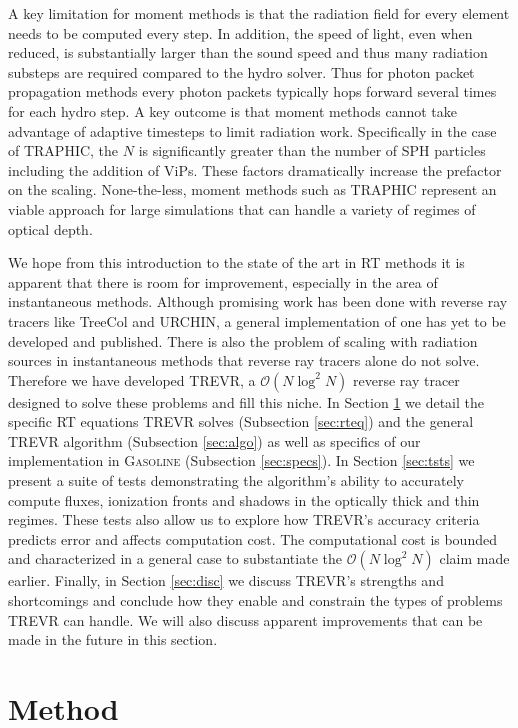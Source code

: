 \documentclass[fleq,usenatbib]{mnras}
\newcommand{\acro}{TREVR}
\newcommand{\bigO}[1]{\mathcal{O}\left(#1\right)}
\begin{document}
A key limitation for moment methods is that the radiation field for every element needs to be 
computed every step.  In addition, the speed of light, even when reduced, is substantially larger than the sound speed and thus many radiation substeps are required compared to the hydro solver.
Thus for photon packet propagation methods every photon packets typically hops
forward several times for each hydro step.
A key outcome is that moment methods cannot take
advantage of adaptive timesteps to limit radiation work.
Specifically in the case of TRAPHIC, the $N$ is significantly greater than 
the number of SPH particles including the addition of ViPs.
These factors dramatically increase the prefactor on the scaling.  None-the-less, moment methods
such as TRAPHIC represent an viable approach for large simulations that can
handle a variety of regimes of optical depth.

We hope from this introduction to the state of the art in RT methods it is 
apparent that there is room for improvement, especially in the area of 
instantaneous methods.  Although promising work has been done with reverse ray 
tracers like TreeCol and URCHIN, a general implementation of one has yet to be 
developed and published. There is also the problem of scaling with radiation 
sources in instantaneous methods that reverse ray tracers alone do not solve. 
Therefore we have developed \acro{}, a $\bigO{N \log^2 N}$ reverse ray tracer 
designed to solve these problems and fill this niche. In Section 
\ref{sec:mthd} we detail the specific RT equations \acro{} solves 
(Subsection \ref{sec:rteq}) and the general \acro{} algorithm (Subsection 
\ref{sec:algo}) as well as specifics of our implementation in 
\textsc{Gasoline} (Subsection \ref{sec:specs}). In Section \ref{sec:tsts} we 
present a suite of tests demonstrating the algorithm's ability to accurately 
compute fluxes, ionization fronts and shadows in the optically thick and thin 
regimes. These tests also allow us to explore how \acro{}'s accuracy criteria 
predicts error and affects computation cost. The computational cost is bounded 
and characterized in a general case to substantiate the $\bigO{N \log^2 N}$ 
claim made earlier. Finally, in Section \ref{sec:disc} we discuss \acro{}'s 
strengths and shortcomings and conclude how they enable and constrain the 
types of problems \acro{} can handle. We will also discuss apparent 
improvements that can be made in the future in this section.

\section{Method}\label{sec:mthd}
\end{document}
